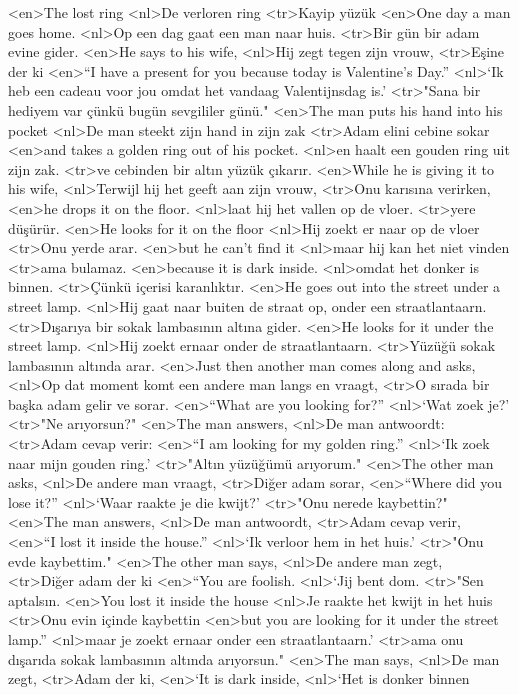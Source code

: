 <en>The lost ring
<nl>De verloren ring
<tr>Kayip yüzük
<en>One day a man goes home.
<nl>Op een dag gaat een man naar huis.
<tr>Bir gün bir adam evine gider.
<en>He says to his wife,
<nl>Hij zegt tegen zijn vrouw,
<tr>Eşine der ki
<en>“I have a present for you because today is Valentine’s Day.”
<nl>`Ik heb een cadeau voor jou omdat het vandaag Valentijnsdag is.'
<tr>"Sana bir hediyem var çünkü bugün sevgililer günü."
<en>The man puts his hand into his pocket
<nl>De man steekt zijn hand in zijn zak
<tr>Adam elini cebine sokar
<en>and takes a golden ring out of his pocket.
<nl>en haalt een gouden ring uit zijn zak.
<tr>ve cebinden bir altın yüzük çıkarır.
<en>While he is giving it to his wife,
<nl>Terwijl hij het geeft aan zijn vrouw,
<tr>Onu karısına verirken,
<en>he drops it on the floor.
<nl>laat hij het vallen op de vloer.
<tr>yere düşürür.
<en>He looks for it on the floor
<nl>Hij zoekt er naar op de vloer
<tr>Onu yerde arar.
<en>but he can’t find it
<nl>maar hij kan het niet vinden
<tr>ama bulamaz.
<en>because it is dark inside.
<nl>omdat het donker is binnen.
<tr>Çünkü içerisi karanlıktır.
<en>He goes out into the street under a street lamp.
<nl>Hij gaat naar buiten de straat op, onder een straatlantaarn.
<tr>Dışarıya bir sokak lambasının altına gider.
<en>He looks for it under the street lamp.
<nl>Hij zoekt ernaar onder de straatlantaarn. 
<tr>Yüzüğü sokak lambasının altında arar.
<en>Just then another man comes along and asks,
<nl>Op dat moment komt een andere man langs en vraagt,
<tr>O sırada bir başka adam gelir ve sorar.
<en>“What are you looking for?”
<nl>`Wat zoek je?'
<tr>"Ne arıyorsun?"
<en>The man answers,
<nl>De man antwoordt: 
<tr>Adam cevap verir:
<en>“I am looking for my golden ring.”
<nl>`Ik zoek naar mijn gouden ring.'
<tr>"Altın yüzüğümü arıyorum."
<en>The other man asks,
<nl>De andere man vraagt,
<tr>Diğer adam sorar,
<en>“Where did you lose it?”
<nl>`Waar raakte je die kwijt?'
<tr>"Onu nerede kaybettin?"
<en>The man answers,
<nl>De man antwoordt,
<tr>Adam cevap verir,
<en>“I lost it inside the house.”
<nl>`Ik verloor hem in het huis.'
<tr>"Onu evde kaybettim."
<en>The other man says,
<nl>De andere man zegt, 
<tr>Diğer adam der ki
<en>“You are foolish.
<nl>`Jij bent dom.
<tr>"Sen aptalsın.
<en>You lost it inside the house
<nl>Je raakte het kwijt in het huis
<tr>Onu evin içinde kaybettin
<en>but you are looking for it under the street lamp.”
<nl>maar je zoekt ernaar onder een straatlantaarn.'
<tr>ama onu dışarıda sokak lambasının altında arıyorsun."
<en>The man says,
<nl>De man zegt, 
<tr>Adam der ki,
<en>`It is dark inside,
<nl>`Het is donker binnen
